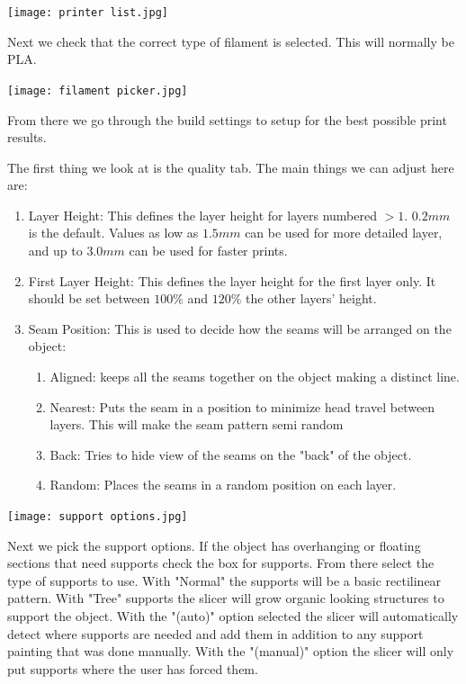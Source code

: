 \documentclass[12pt,legalpaper]{article}
\begin{document}
\texttt{[image: printer list.jpg]}

Next we check that the correct type of filament is selected. This will normally be PLA.

\texttt{[image: filament picker.jpg]}

From there we go through the build settings to setup for the best possible print results.

The first thing we look at is the quality tab. The main things we can adjust here are:
\begin{enumerate}
    \item Layer Height: This defines the layer height for layers numbered $>1$. $0.2mm$ is the default.
    Values as low as $1.5mm$ can be used for more detailed layer, and up to $3.0mm$ can be used for faster prints.
    \item First Layer Height: This defines the layer height for the first layer only. 
    It should be set between $100\%$ and $120\%$ the other layers' height.
    \item Seam Position: This is used to decide how the seams will be arranged on the object:
    \begin{enumerate}
        \item Aligned: keeps all the seams together on the object making a distinct line.
        \item Nearest: Puts the seam in a position to minimize head travel between layers. This will make the seam pattern semi random
        \item Back: Tries to hide view of the seams on the "back" of the object.
        \item Random: Places the seams in a random position on each layer.
    \end{enumerate}
\end{enumerate}

\texttt{[image: support options.jpg]}

Next we pick the support options. If the object has overhanging or floating sections that need supports check the box for supports.
From there select the type of supports to use. With "Normal" the supports will be a basic rectilinear pattern. 
With "Tree" supports the slicer will grow organic looking structures to support the object.
With the "(auto)" option selected the slicer will automatically detect where supports are needed and add them in addition to any support painting that was done manually.
With the "(manual)" option the slicer will only put supports where the user has forced them.
\end{document}
